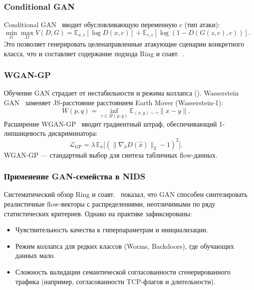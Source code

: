 \subsubsection{Conditional GAN}

Conditional GAN~\cite{mirza2014cgan} вводит обусловливающую переменную \(c\)
(тип атаки):
\begin{equation}
\min_{G}\max_{D}
V(D,G) = \mathbb{E}_{x,c}[\log D(x,c)] +
         \mathbb{E}_{z,c}[\log(1 - D(G(z,c), c))].
\label{eq:cgan}
\end{equation}
Это позволяет генерировать целенаправленные атакующие сценарии конкретного
класса, что и составляет содержание подхода
Ring и соавт.~\cite{ring2019flowgan}.

\subsubsection{WGAN-GP}

Обучение GAN страдает от нестабильности и режима коллапса (). Wasserstein GAN~\cite{arjovsky2017wgan} заменяет JS-расстояние
расстоянием Earth Mover (Wasserstein-1):
\begin{equation}
W(p, q) = \inf_{\gamma \in \Pi(p, q)} \mathbb{E}_{(x,y) \sim \gamma}\|x - y\|.
\label{eq:wgan}
\end{equation}
Расширение WGAN-GP~\cite{gulrajani2017wgangp} вводит градиентный штраф,
обеспечивающий 1-липшицевость дискриминатора:
\begin{equation}
\mathcal{L}_{\text{GP}} = \lambda\,
\mathbb{E}_{\hat{x}}\bigl[(\|\nabla_{\hat{x}} D(\hat{x})\|_2 - 1)^2\bigr].
\label{eq:wgangp}
\end{equation}
WGAN-GP --- стандартный выбор для синтеза табличных flow-данных.

\subsubsection{Применение GAN-семейства в NIDS}

Систематический обзор Ring и соавт.~\cite{ring2019flowgan} показал, что
GAN способен синтезировать реалистичные flow-векторы с распределениями,
неотличимыми по ряду статистических критериев. Однако на практике
зафиксированы:

\begin{itemize}
    \item Чувствительность качества к гиперпараметрам и инициализации.
    \item Режим коллапса для редких классов (Worms, Backdoors), где
    обучающих данных мало.
    \item Сложность валидации семантической согласованности
    сгенерированного трафика (например, согласованности TCP-флагов и
    длительности).
\end{itemize}

